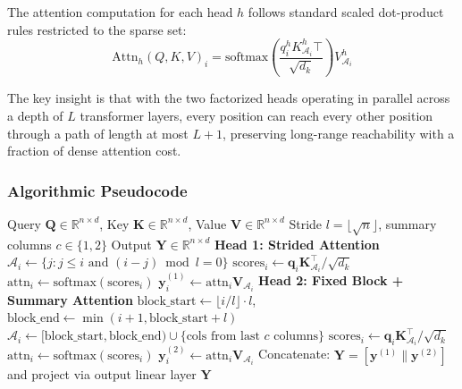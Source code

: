 \documentclass[11pt,a4paper]{article}
\begin{document}
The attention computation for each head $h$ follows standard scaled dot-product rules restricted to the sparse set:
\[
\text{Attn}_h(Q, K, V)_i = \text{softmax}\left(\frac{q_i^h K_{\mathcal{A}_i}^h\top}{\sqrt{d_k}}\right) V_{\mathcal{A}_i}^h
\]

The key insight is that with the two factorized heads operating in parallel across a depth of $L$ transformer layers, every position can reach every other position through a path of length at most $L + 1$, preserving long-range reachability with a fraction of dense attention cost.

\subsubsection{Algorithmic Pseudocode}

\begin{algorithm}[H]
\caption{Sparse Transformer Attention: Strided + Fixed Dual Heads}
\begin{algorithmic}[1]
\Require Query $\mathbf{Q} \in \mathbb{R}^{n \times d}$, Key $\mathbf{K} \in \mathbb{R}^{n \times d}$, Value $\mathbf{V} \in \mathbb{R}^{n \times d}$
\Require Stride $l = \lfloor\sqrt{n}\rfloor$, summary columns $c \in \{1, 2\}$
\Ensure Output $\mathbf{Y} \in \mathbb{R}^{n \times d}$
\State \textbf{Head 1: Strided Attention}
    \State $\mathcal{A}_i \gets \{j : j \leq i \text{ and } (i-j) \bmod l = 0\}$ 
    \State $\text{scores}_{i} \gets \mathbf{q}_i \mathbf{K}_{\mathcal{A}_i}^\top / \sqrt{d_k}$
    \State $\text{attn}_{i} \gets \text{softmax}(\text{scores}_{i})$
    \State $\mathbf{y}_i^{(1)} \gets \text{attn}_{i} \mathbf{V}_{\mathcal{A}_i}$
\EndFor
\State \textbf{Head 2: Fixed Block + Summary Attention}
    \State $\text{block\_start} \gets \lfloor i/l \rfloor \cdot l$, $\text{block\_end} \gets \min(i+1, \text{block\_start}+l)$
    \State $\mathcal{A}_i \gets [\text{block\_start}, \text{block\_end}) \cup \{\text{cols from last } c \text{ columns}\}$
    \State $\text{scores}_{i} \gets \mathbf{q}_i \mathbf{K}_{\mathcal{A}_i}^\top / \sqrt{d_k}$
    \State $\text{attn}_{i} \gets \text{softmax}(\text{scores}_{i})$
    \State $\mathbf{y}_i^{(2)} \gets \text{attn}_{i} \mathbf{V}_{\mathcal{A}_i}$
\EndFor
\State Concatenate: $\mathbf{Y} = [\mathbf{y}^{(1)} \| \mathbf{y}^{(2)}]$ and project via output linear layer
\Return $\mathbf{Y}$
\end{algorithmic}
\end{algorithm}
\end{document}
